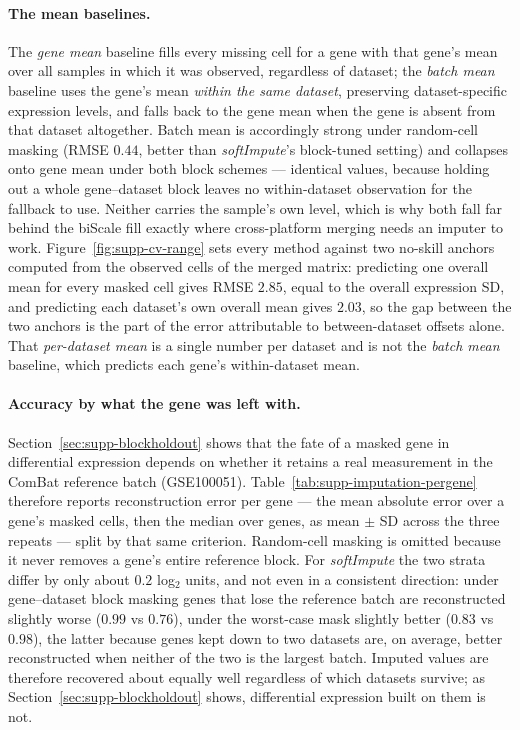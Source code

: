 \documentclass[11pt,a4paper]{article}
\begin{document}
\paragraph{The mean baselines.}
The \emph{gene mean} baseline fills every missing cell for a
gene with that gene's mean over all samples in which it was
observed, regardless of dataset; the \emph{batch mean} baseline
uses the gene's mean \emph{within the same dataset}, preserving
dataset-specific expression levels, and falls back to the gene
mean when the gene is absent from that dataset altogether.
Batch mean is accordingly strong under random-cell masking (RMSE
$0.44$, better than \textit{softImpute}'s block-tuned setting) and
collapses onto gene mean under both block schemes --- identical
values, because holding out a whole gene--dataset block leaves
no within-dataset observation for the fallback to use. Neither
carries the sample's own level, which is why both fall far
behind the biScale fill exactly where cross-platform merging
needs an imputer to work.
Figure~\ref{fig:supp-cv-range} sets every method against two
no-skill anchors computed from the observed cells of the merged
matrix: predicting one overall mean for every masked cell
gives RMSE $2.85$, equal to the overall expression SD, and
predicting each dataset's own overall mean gives $2.03$, so the
gap between the two anchors is the part of the error
attributable to between-dataset offsets alone. That
\emph{per-dataset mean} is a single number per dataset and is
not the \emph{batch mean} baseline, which predicts each gene's
within-dataset mean.

\paragraph{Accuracy by what the gene was left with.}
Section~\ref{sec:supp-blockholdout} shows that the fate of a
masked gene in differential expression depends on whether it
retains a real measurement in the ComBat reference batch
(GSE100051). Table~\ref{tab:supp-imputation-pergene} therefore
reports reconstruction error per gene --- the mean absolute
error over a gene's masked cells, then the median over genes,
as mean $\pm$ SD across the three repeats --- split by that
same criterion. Random-cell masking is omitted because it
never removes a gene's entire reference block. For
\textit{softImpute} the two strata differ by only about
$0.2$ log$_2$ units, and not even in a consistent direction:
under gene--dataset block masking genes that lose the
reference batch are reconstructed slightly worse ($0.99$ vs
$0.76$), under the worst-case mask slightly better ($0.83$ vs
$0.98$), the latter because genes kept down to two datasets
are, on average, better reconstructed when neither of the two
is the largest batch. Imputed values are therefore recovered
about equally well regardless of which datasets survive; as
Section~\ref{sec:supp-blockholdout} shows, differential
expression built on them is not.
\end{document}
